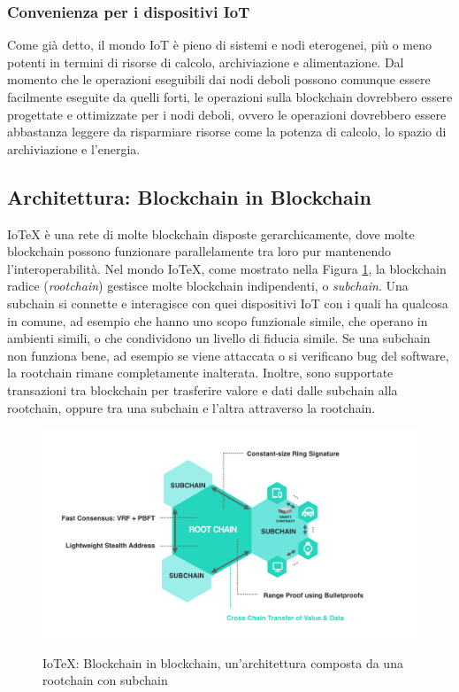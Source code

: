 \subsubsection{Convenienza per i dispositivi IoT}
Come già detto, il mondo IoT è pieno di sistemi e nodi eterogenei, più o meno potenti in termini di risorse di calcolo, archiviazione e alimentazione. Dal momento che le operazioni eseguibili dai nodi deboli possono comunque essere facilmente eseguite da quelli forti, le operazioni sulla blockchain dovrebbero essere progettate e ottimizzate per i nodi deboli, ovvero le operazioni dovrebbero essere abbastanza leggere da risparmiare risorse come la potenza di calcolo, lo spazio di archiviazione e l'energia.

\subsection{Architettura: Blockchain in Blockchain}
IoTeX è una rete di molte blockchain disposte gerarchicamente, dove molte blockchain possono funzionare parallelamente tra loro pur mantenendo l'interoperabilità. Nel mondo IoTeX, come mostrato nella Figura \ref{fig:fig1}, la blockchain radice (\emph{rootchain}) gestisce molte blockchain indipendenti, o \emph{subchain}. Una subchain si connette e interagisce con quei dispositivi IoT con i quali ha qualcosa in comune, ad esempio che hanno uno scopo funzionale simile, che operano in ambienti simili, o che condividono un livello di fiducia simile. Se una subchain non funziona bene, ad esempio se viene attaccata o si verificano bug del software, la rootchain rimane completamente inalterata. Inoltre, sono supportate transazioni tra blockchain per trasferire valore e dati dalle subchain alla rootchain, oppure tra una subchain e l'altra attraverso la rootchain.

\begin{figure}[ht]
	\includegraphics[width=\textwidth]{Figura1.png}
	\label{fig:fig1}
	\caption{IoTeX: Blockchain in blockchain, un'architettura composta da una rootchain con subchain}
\end{figure}

